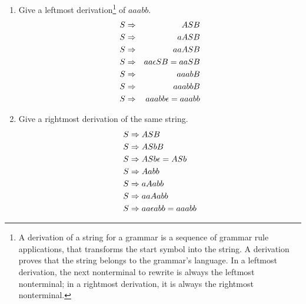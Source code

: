 \documentclass[10pt,a4paper,final]{article}
\begin{document}
\begin{enumerate}
\begin{enumerate}
  \item %
  Give a leftmost derivation\footnote{A derivation of a string for a grammar is a sequence of grammar
  rule applications, that transforms the start symbol into the string. A derivation proves that the
  string belongs to the grammar's language. In a leftmost derivation, the next nonterminal to rewrite
  is always the leftmost nonterminal; in a rightmost derivation, it is always the rightmost
  nonterminal.} of $aaabb$.
  \begin{eqnarray}
    \setcounter{equation}{1}
    S &\Rightarrow& ASB \\
    \setcounter{equation}{4}
    S &\Rightarrow& aASB \\
    \setcounter{equation}{4}
    S &\Rightarrow& aaASB \\
    \setcounter{equation}{5}
    S &\Rightarrow& aa \epsilon SB = aaSB \\
    \setcounter{equation}{2}
    S &\Rightarrow& aaabB \\
    \setcounter{equation}{6}
    S &\Rightarrow& aaabbB \\
    \setcounter{equation}{7}
    S &\Rightarrow& aaabb\epsilon = aaabb
  \end{eqnarray}

  \item %
  Give a rightmost derivation of the same string.
  \begin{align} %
    \setcounter{equation}{0} %
    S &\Rightarrow ASB \\
    \setcounter{equation}{5}
    S &\Rightarrow ASbB \\
    S &\Rightarrow ASb \epsilon = ASb \\
    \setcounter{equation}{1}
    S &\Rightarrow Aabb \\
    \setcounter{equation}{3}
    S &\Rightarrow aAabb \\
    \setcounter{equation}{3}
    S &\Rightarrow aaAabb \\
    S &\Rightarrow aa \epsilon abb = aaabb
  \end{align}


\end{enumerate}
\end{enumerate}
\end{document}
